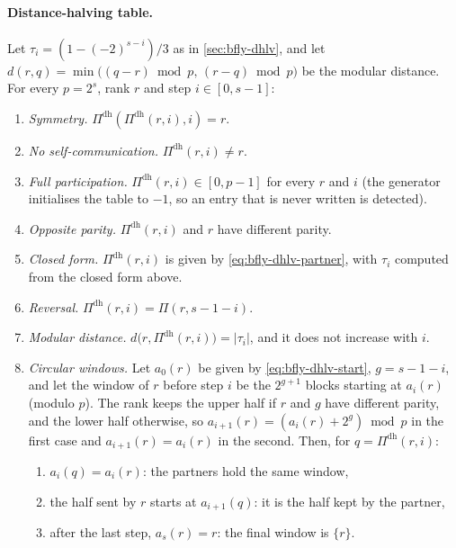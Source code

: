 \paragraph{Distance-halving table.}
Let $\tau_i=(1-(-2)^{s-i})/3$ as in \cref{sec:bfly-dhlv}, and let $d(r,q)=\min\bigl((q-r)\bmod p,\,(r-q)\bmod p\bigr)$ be the modular distance.
For every $p=2^s$, rank $r$ and step $i\in[0,s-1]$:
\begingroup
\renewcommand{\theenumi}{K\arabic{enumi}}
\renewcommand{\labelenumi}{\textbf{(\theenumi)}}
\begin{enumerate}
  \item \label{inv:dh-sym} \emph{Symmetry.} $\Pi^{\mathrm{dh}}(\Pi^{\mathrm{dh}}(r,i),i)=r$.
  \item \label{inv:dh-self} \emph{No self-communication.} $\Pi^{\mathrm{dh}}(r,i)\neq r$.
  \item \label{inv:dh-full} \emph{Full participation.} $\Pi^{\mathrm{dh}}(r,i)\in[0,p-1]$ for every $r$ and $i$ (the generator initialises the table to $-1$, so an entry that is never written is detected).
  \item \label{inv:dh-parity} \emph{Opposite parity.} $\Pi^{\mathrm{dh}}(r,i)$ and $r$ have different parity.
  \item \label{inv:dh-closed} \emph{Closed form.} $\Pi^{\mathrm{dh}}(r,i)$ is given by \cref{eq:bfly-dhlv-partner}, with $\tau_i$ computed from the closed form above.
  \item \label{inv:dh-rev} \emph{Reversal.} $\Pi^{\mathrm{dh}}(r,i)=\Pi(r,s-1-i)$.
  \item \label{inv:dh-dist} \emph{Modular distance.} $d\bigl(r,\Pi^{\mathrm{dh}}(r,i)\bigr)=\lvert\tau_i\rvert$, and it does not increase with $i$.
  \item \label{inv:dh-window} \emph{Circular windows.} Let $a_0(r)$ be given by \cref{eq:bfly-dhlv-start}, $g=s-1-i$, and let the window of $r$ before step $i$ be the $2^{g+1}$ blocks starting at $a_i(r)$ (modulo $p$).
  The rank keeps the upper half if $r$ and $g$ have different parity, and the lower half otherwise, so $a_{i+1}(r)=(a_i(r)+2^g)\bmod p$ in the first case and $a_{i+1}(r)=a_i(r)$ in the second.
  Then, for $q=\Pi^{\mathrm{dh}}(r,i)$:
  \begin{enumerate}
    \item[(a)] $a_i(q)=a_i(r)$: the partners hold the same window,
    \item[(b)] the half sent by $r$ starts at $a_{i+1}(q)$: it is the half kept by the partner,
    \item[(c)] after the last step, $a_s(r)=r$: the final window is $\{r\}$.
  \end{enumerate}
\end{enumerate}
\endgroup

